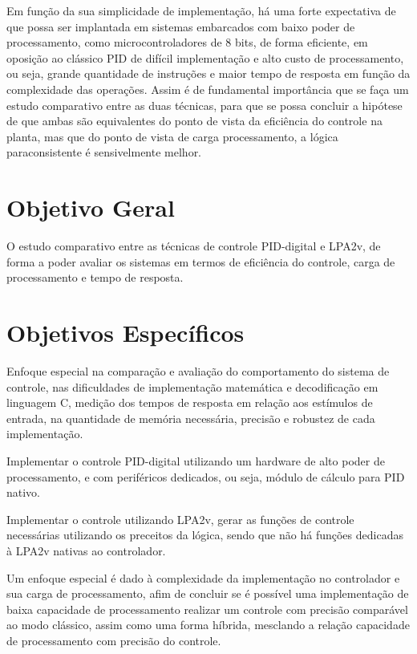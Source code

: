 Em função da sua simplicidade de implementação, há uma forte expectativa de que possa ser implantada em sistemas embarcados com baixo poder de processamento, como microcontroladores de 8 bits, de forma eficiente, em oposição ao clássico PID de difícil implementação e alto custo de processamento, ou seja, grande quantidade de instruções e maior tempo de resposta em função da complexidade das operações. Assim é de fundamental importância que se faça um estudo comparativo entre as duas técnicas, para que se possa concluir a hipótese de que ambas são equivalentes do ponto de vista da eficiência do controle na planta, mas que do ponto de vista de carga processamento, a lógica paraconsistente é sensivelmente melhor.


\section{Objetivo Geral}
O estudo comparativo entre as técnicas de controle PID-digital e LPA2v, de forma a poder avaliar os sistemas em termos de eficiência do controle, carga de processamento e tempo de resposta.


\section{Objetivos Específicos}
Enfoque especial na comparação e avaliação do comportamento do sistema de controle, nas dificuldades de implementação matemática e decodificação em linguagem C, medição dos tempos de resposta em relação aos estímulos de entrada, na quantidade de memória necessária, precisão e robustez de cada implementação.

Implementar o controle PID-digital utilizando um hardware de alto poder de processamento, e com periféricos dedicados, ou seja, módulo de cálculo para PID nativo. 

Implementar o controle utilizando LPA2v, gerar as funções de controle necessárias utilizando os preceitos da lógica, sendo que não há funções dedicadas à LPA2v nativas ao controlador.

Um enfoque especial é dado à complexidade da implementação no controlador e sua carga de processamento, afim de concluir se é possível uma implementação de baixa capacidade de processamento realizar um controle com precisão comparável ao modo clássico, assim como uma forma híbrida, mesclando a relação capacidade de processamento com precisão do controle. 


